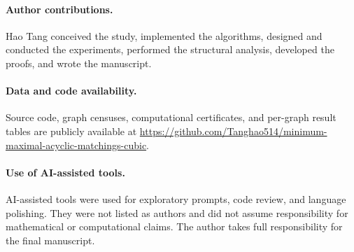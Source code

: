 \documentclass[smallextended,natbib,nospthms]{svjour3}
\theoremstyle{definition}
\theoremstyle{remark}
\begin{document}
\paragraph{Author contributions.}
Hao Tang conceived the study, implemented the algorithms, designed and
conducted the experiments, performed the structural analysis, developed the
proofs, and wrote the manuscript.

\paragraph{Data and code availability.}
Source code, graph censuses, computational certificates, and per-graph result
tables are publicly available at
\url{https://github.com/Tanghao514/minimum-maximal-acyclic-matchings-cubic}.

\paragraph{Use of AI-assisted tools.}
AI-assisted tools were used for exploratory prompts, code review, and language
polishing. They were not listed as authors and did not assume responsibility
for mathematical or computational claims. The author takes full
responsibility for the final manuscript.
\end{document}
